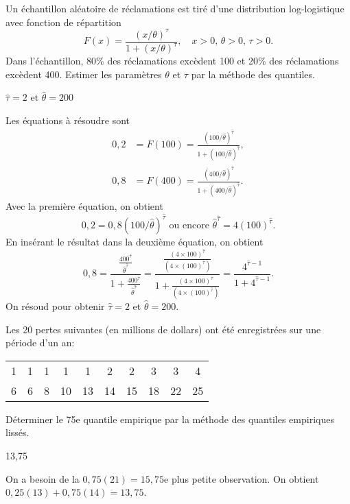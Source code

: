 \begin{exercice}
Un échantillon aléatoire de réclamations est tiré d'une distribution log-logistique avec fonction de répartition
$$
F(x)=\frac{(x/\theta)^\tau}{1+(x/\theta)^\tau}, \quad x>0, \, \theta >0, \, \tau >0.
$$
Dans l'échantillon, 80\% des réclamations excèdent 100 et 20\% des réclamations excèdent 400. Estimer les paramètres $\theta$ et $\tau$ par la méthode des quantiles.

\begin{rep}
$\hat{\tau}=2$ et $\hat{\theta}=200$
\end{rep}

\begin{sol}
Les équations à résoudre sont
\begin{align*}
0,2 &= F(100) = \frac{(100/\hat{\theta})^{\hat{\tau}}}{1+(100/\hat{\theta})^{\hat{\tau}}}, \\
0,8 &= F(400) = \frac{(400/\hat{\theta})^{\hat{\tau}}}{1+(400/\hat{\theta})^{\hat{\tau}}}.
\end{align*}
Avec la première équation, on obtient
$$
0,2=0,8(100/\hat{\theta})^{\hat{\tau}} \text{ ou encore } \hat{\theta}^{\hat{\tau}}=4(100)^{\hat{\tau}}. 
$$
En insérant le résultat dans la deuxième équation, on obtient
$$
0,8 = \frac{\frac{400^{\hat{\tau}}}{\hat{\theta}^{\hat{\tau}}}}{1+\frac{400^{\hat{\tau}}}{\hat{\theta}^{\hat{\tau}}}}
=\frac{\frac{(4 \times 100)^{\hat{\tau}}}{(4 \times (100)^{\hat{\tau}})}}{1+\frac{(4 \times 100)^{\hat{\tau}}}{(4 \times (100)^{\hat{\tau}})}}
= \frac{4^{\hat{\tau}-1}}{1+4^{\hat{\tau}-1}}.
$$
On résoud pour obtenir $\hat{\tau}=2$ et $\hat{\theta}=200$.
\end{sol}
\end{exercice}

\begin{exercice}
Les 20 pertes suivantes (en millions de dollars) ont été enregistrées sur une période d'un an:
\begin{center}
\begin{tabular}{cccccccccc}
1 & 1 & 1 & 1 & 1 & 2 & 2 & 3 & 3 & 4 \\
6 & 6 & 8 & 10 & 13 & 14 & 15 & 18 & 22 & 25
\end{tabular}
\end{center}
Déterminer le 75e quantile empirique par la méthode des quantiles empiriques lissés.

\begin{rep}
13,75
\end{rep}

\begin{sol}
On a besoin de la $0,75(21)=15,75$e plus petite observation. On obtient $0,25(13) + 0,75(14)= 13,75$.
\end{sol}
\end{exercice}

